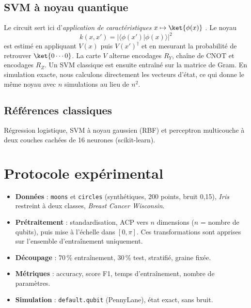 \documentclass[11pt,a4paper]{article}
\begin{document}
\subsection{SVM à noyau quantique}
Le circuit sert ici d'\emph{application de caractéristiques} $x \mapsto \ket{\phi(x)}$
\cite{havlicek2019}. Le noyau
\begin{equation}
  k(x, x') = \left|\langle \phi(x') | \phi(x) \rangle\right|^2
\end{equation}
est estimé en appliquant $V(x)$ puis $V(x')^\dagger$ et en mesurant la probabilité de
retrouver $\ket{0\cdots0}$. La carte $V$ alterne encodages $R_Y$, chaîne de CNOT et
encodages $R_Z$. Un SVM classique est ensuite entraîné sur la matrice de Gram. En simulation
exacte, nous calculons directement les vecteurs d'état, ce qui donne le même noyau avec
$n$ simulations au lieu de $n^2$.

\subsection{Références classiques}
Régression logistique, SVM à noyau gaussien (RBF) et perceptron multicouche à deux couches
cachées de 16 neurones (scikit-learn).

\section{Protocole expérimental}

\begin{itemize}
  \item \textbf{Données} : \texttt{moons} et \texttt{circles} (synthétiques, 200 points,
        bruit 0{,}15), \emph{Iris} restreint à deux classes, \emph{Breast Cancer Wisconsin}.
  \item \textbf{Prétraitement} : standardisation, ACP vers $n$ dimensions ($n$ = nombre de
        qubits), puis mise à l'échelle dans $[0, \pi]$. Ces transformations sont apprises
        sur l'ensemble d'entraînement uniquement.
  \item \textbf{Découpage} : 70\,\% entraînement, 30\,\% test, stratifié, graine fixée.
  \item \textbf{Métriques} : accuracy, score F1, temps d'entraînement, nombre de paramètres.
  \item \textbf{Simulation} : \texttt{default.qubit} (PennyLane), état exact, sans bruit.
\end{itemize}
\end{document}
